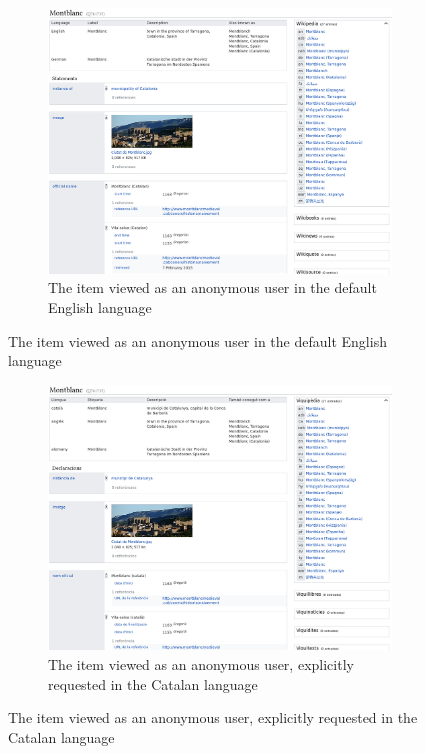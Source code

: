 \begin{figure}
  \caption{Two screenshots of the same \gls{item} viewed in different languages}
  \label{fig:montblanc}
  \begin{subfigure}{\textwidth}
    \caption{The \gls{item} viewed as an anonymous user in the default English language}
    \label{fig:montblanc-en}
    \includegraphics[width=\textwidth]{screenshots/montblanc-en}
  \end{subfigure}
\end{figure}
\begin{figure}\ContinuedFloat
  \begin{subfigure}{\textwidth}
    \caption{The \gls{item} viewed as an anonymous user, explicitly requested in the Catalan language}
    \label{fig:montblanc-ca}
    \includegraphics[width=\textwidth]{screenshots/montblanc-ca}
  \end{subfigure}
\end{figure}

